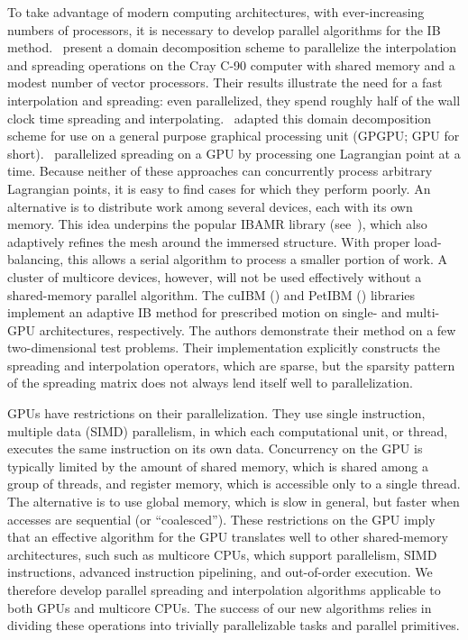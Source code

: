 To take advantage of modern computing architectures, with ever-increasing numbers of
processors, it is necessary to develop parallel algorithms for the IB method.~%
\cite{McQueen:1997kw} present a domain decomposition scheme to parallelize the
interpolation and spreading operations on the Cray C-90 computer with shared memory and a
modest number of vector processors. Their results illustrate the need for a fast
interpolation and spreading: even parallelized, they spend roughly half of the wall clock
time spreading and interpolating.~\cite{Fai:2013do} adapted this domain decomposition
scheme for use on a general purpose graphical processing unit (GPGPU; GPU for short).~%
\cite{Patel:2012tc} parallelized spreading on a GPU by processing one Lagrangian point at
a time. Because neither of these approaches can concurrently process arbitrary Lagrangian
points, it is easy to find cases for which they perform poorly. An alternative is to
distribute work among several devices, each with its own memory. This idea underpins the
popular IBAMR library (see~\cite{Griffith:2007uk,Griffith:2007do,Griffith:2009gg,
Griffith:2011gi,Griffith:2017id}), which also adaptively refines the mesh around the
immersed structure. With proper load-balancing, this allows a serial algorithm to process
a smaller portion of work. A cluster of multicore devices, however, will not be used
effectively without a shared-memory parallel algorithm. The cuIBM (\cite{Layton:2011um})
and PetIBM (\cite{Mesnard:2017te,Chuang:2018ej}) libraries implement an adaptive IB
method for prescribed motion on single- and multi-GPU architectures, respectively. The
authors demonstrate their method on a few two-dimensional test problems. Their
implementation explicitly constructs the spreading and interpolation operators, which are
sparse, but the sparsity pattern of the spreading matrix does not always lend itself well
to parallelization.

GPUs have restrictions on their parallelization. They use single instruction,
multiple data (SIMD) parallelism, in which each computational unit, or thread, executes
the same instruction on its own data. Concurrency on the GPU is typically limited by the
amount of shared memory, which is shared among a group of threads, and register memory,
which is accessible only to a single thread. The alternative is to use global memory,
which is slow in general, but faster when accesses are sequential (or ``coalesced'').
These restrictions on the GPU imply that an effective algorithm for the GPU translates
well to other shared-memory architectures, such such as multicore CPUs, which support
parallelism, SIMD instructions, advanced instruction pipelining, and out-of-order
execution. We therefore develop parallel spreading and interpolation algorithms
applicable to both GPUs and multicore CPUs. The success of our new algorithms relies in
dividing these operations into trivially parallelizable tasks and parallel primitives.

